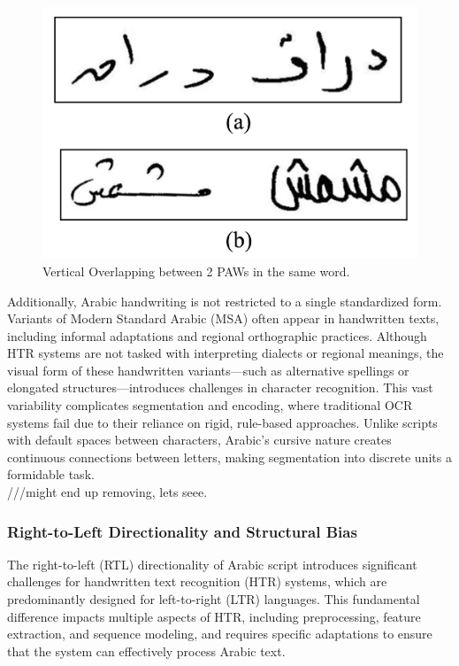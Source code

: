 \documentclass[conference]{IEEEtran}
\begin{document}
\begin{figure}[ht]
  \centering
  \includegraphics[width=0.7\linewidth]{Figs/fig4.png}
  \caption{Vertical Overlapping between 2 PAWs in the same word.}
  \label{fig:mr}
\end{figure}

Additionally, Arabic handwriting is not restricted to a single standardized form. Variants of Modern Standard Arabic (MSA) often appear in handwritten texts, including informal adaptations and regional orthographic practices. Although HTR systems are not tasked with interpreting dialects or regional meanings, the visual form of these handwritten variants—such as alternative spellings or elongated structures—introduces challenges in character recognition. This vast variability complicates segmentation and encoding, where traditional OCR systems fail due to their reliance on rigid, rule-based approaches. Unlike scripts with default spaces between characters, Arabic’s cursive nature creates continuous connections between letters, making segmentation into discrete units a formidable task. \\


///might end up removing, lets seee.



\subsubsection{Right-to-Left Directionality and Structural Bias}


The right-to-left (RTL) directionality of Arabic script introduces significant challenges for handwritten text recognition (HTR) systems, which are predominantly designed for left-to-right (LTR) languages. This fundamental difference impacts multiple aspects of HTR, including preprocessing, feature extraction, and sequence modeling, and requires specific adaptations to ensure that the system can effectively process Arabic text.
\end{document}
